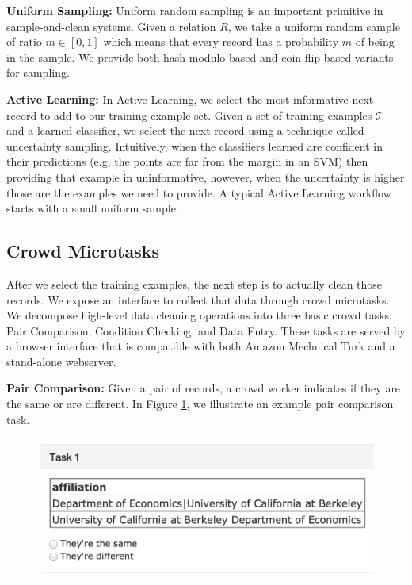 \noindent\textbf{Uniform Sampling: } Uniform random sampling is an important primitive in sample-and-clean systems. Given a relation $R$, we take a uniform random sample of ratio $m\in[0,1]$ which means that every record has a probability $m$ of being in the sample. We provide both hash-modulo based and coin-flip based variants for sampling.

\noindent\textbf{Active Learning: } In Active Learning, we select the most informative next record to add to our training example set. Given a set of training examples $\mathcal{T}$ and a learned classifier, we select the next record using a technique called uncertainty sampling. Intuitively, when the classifiers learned are confident in their predictions (e.g, the points are far from the margin in an SVM) then providing that example in uninformative, however, when the uncertainty is higher those are the examples we need to provide. A typical Active Learning workflow starts with a small uniform sample.

\subsection{Crowd Microtasks}
After we select the training examples, the next step is to actually clean those records.
We expose an interface to collect that data through crowd microtasks.
We decompose high-level data cleaning operations into three basic crowd tasks: Pair Comparison, Condition Checking, and Data Entry.
These tasks are served by a browser interface that is compatible with both Amazon Mechnical Turk and a stand-alone webserver.

\noindent\textbf{Pair Comparison: } Given a pair of records, a crowd worker indicates if they are the same or are different. In Figure \ref{fig:pair},
we illustrate an example pair comparison task.

\begin{figure}[ht!]
\centering
\includegraphics[scale=0.25]{figs/pair.png}
\caption{ \label{fig:pair}}\vspace{-.5em}
\end{figure}

